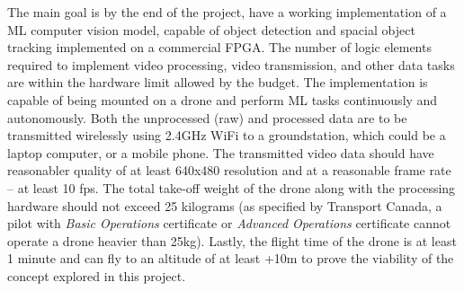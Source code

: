 The main goal is by the end of the project, have a working implementation
of a ML computer vision model, capable of object detection and spacial
object tracking implemented on a commercial FPGA. The number of logic elements 
required to implement video processing, video transmission, and other
data tasks are within the hardware limit allowed by the budget.
The implementation is capable of being mounted on a drone and perform ML
tasks continuously and autonomously. Both the unprocessed (raw) and processed
data are to be transmitted wirelessly using 2.4GHz WiFi to a groundstation, 
which could be a laptop computer, or a mobile phone. The transmitted video
data should have reasonabler quality of at least 640x480 resolution and at 
a reasonable frame rate -- at least 10 fps. The total take-off weight of the
drone along with the processing hardware should not exceed 25 kilograms
(as specified by Transport Canada, a pilot with \textit{Basic Operations}
certificate or \textit{Advanced Operations} certificate cannot operate a 
drone heavier than 25kg). Lastly, the flight time of the drone is at least 
1 minute and can fly to an altitude of at least +10m to prove the viability
of the concept explored in this project.